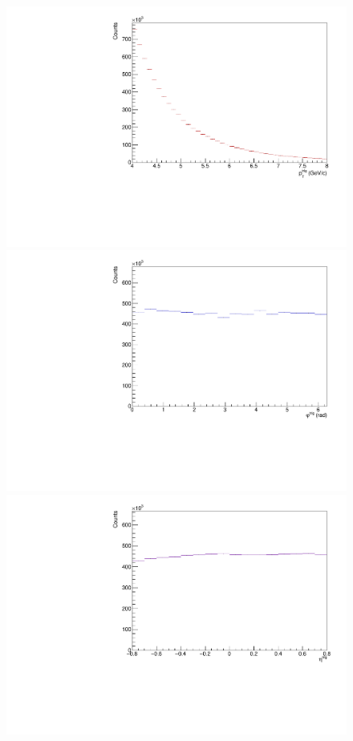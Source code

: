 \begin{figure}[t!]
	\centering
	\begin{minipage}{0.32\textwidth}
		\includegraphics[width=\textwidth]{figures/analysis/trig_pt_dist_0_20.pdf}	
	\end{minipage}
	\begin{minipage}{0.32\textwidth}
		\includegraphics[width=\textwidth]{figures/analysis/trig_phi_dist_0_20.pdf}
	\end{minipage}
	\begin{minipage}{0.32\textwidth}
		\includegraphics[width=\textwidth]{figures/analysis/trig_eta_dist_0_20.pdf}

\end{minipage}
\end{figure}
